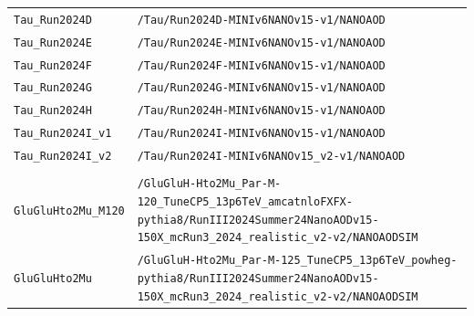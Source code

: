 \begin{longtable}{@{}>{\RaggedRight\arraybackslash}p{} >{\RaggedRight\arraybackslash}p{}@{}}
\addlinespace[2pt]
\texttt{Tau\_\allowbreak{}Run2024D} & \texttt{/\allowbreak{}Tau/\allowbreak{}Run2024D-\allowbreak{}MINIv6NANOv15-\allowbreak{}v1/\allowbreak{}NANOAOD} \\
\addlinespace[2pt]
\texttt{Tau\_\allowbreak{}Run2024E} & \texttt{/\allowbreak{}Tau/\allowbreak{}Run2024E-\allowbreak{}MINIv6NANOv15-\allowbreak{}v1/\allowbreak{}NANOAOD} \\
\addlinespace[2pt]
\texttt{Tau\_\allowbreak{}Run2024F} & \texttt{/\allowbreak{}Tau/\allowbreak{}Run2024F-\allowbreak{}MINIv6NANOv15-\allowbreak{}v1/\allowbreak{}NANOAOD} \\
\addlinespace[2pt]
\texttt{Tau\_\allowbreak{}Run2024G} & \texttt{/\allowbreak{}Tau/\allowbreak{}Run2024G-\allowbreak{}MINIv6NANOv15-\allowbreak{}v1/\allowbreak{}NANOAOD} \\
\addlinespace[2pt]
\texttt{Tau\_\allowbreak{}Run2024H} & \texttt{/\allowbreak{}Tau/\allowbreak{}Run2024H-\allowbreak{}MINIv6NANOv15-\allowbreak{}v1/\allowbreak{}NANOAOD} \\
\addlinespace[2pt]
\texttt{Tau\_\allowbreak{}Run2024I\_\allowbreak{}v1} & \texttt{/\allowbreak{}Tau/\allowbreak{}Run2024I-\allowbreak{}MINIv6NANOv15-\allowbreak{}v1/\allowbreak{}NANOAOD} \\
\addlinespace[2pt]
\texttt{Tau\_\allowbreak{}Run2024I\_\allowbreak{}v2} & \texttt{/\allowbreak{}Tau/\allowbreak{}Run2024I-\allowbreak{}MINIv6NANOv15\_\allowbreak{}v2-\allowbreak{}v1/\allowbreak{}NANOAOD} \\
\addlinespace[2pt]
\addlinespace[4pt]
\multicolumn{2}{@{}l}{\bfseries Simulation (177 samples)} \\
\addlinespace[2pt]
\texttt{GluGluHto2Mu\_\allowbreak{}M120} & \texttt{/\allowbreak{}GluGluH-\allowbreak{}Hto2Mu\_\allowbreak{}Par-\allowbreak{}M-\allowbreak{}120\_\allowbreak{}TuneCP5\_\allowbreak{}13p6TeV\_\allowbreak{}amcatnloFXFX-\allowbreak{}pythia8/\allowbreak{}RunIII2024Summer24NanoAODv15-\allowbreak{}150X\_\allowbreak{}mcRun3\_\allowbreak{}2024\_\allowbreak{}realistic\_\allowbreak{}v2-\allowbreak{}v2/\allowbreak{}NANOAODSIM} \\
\addlinespace[2pt]
\texttt{GluGluHto2Mu} & \texttt{/\allowbreak{}GluGluH-\allowbreak{}Hto2Mu\_\allowbreak{}Par-\allowbreak{}M-\allowbreak{}125\_\allowbreak{}TuneCP5\_\allowbreak{}13p6TeV\_\allowbreak{}powheg-\allowbreak{}pythia8/\allowbreak{}RunIII2024Summer24NanoAODv15-\allowbreak{}150X\_\allowbreak{}mcRun3\_\allowbreak{}2024\_\allowbreak{}realistic\_\allowbreak{}v2-\allowbreak{}v2/\allowbreak{}NANOAODSIM} \\

\end{longtable}
